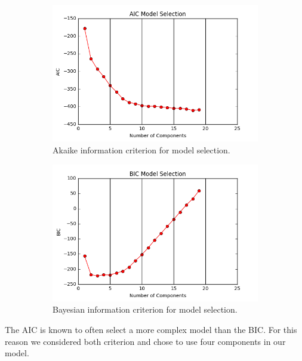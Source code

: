\documentclass{article}
\begin{document}
\begin{figure}[H]
\begin{subfigure}[t]{0.45\textwidth}
\centering
\includegraphics[width=.99\textwidth]{../figs/aic_model.png}
\caption{Akaike information criterion for model selection.}
\label{fig:subim1}
\end{subfigure}\hfill
\begin{subfigure}[t]{0.45\textwidth}
\centering
\includegraphics[width=.99\textwidth]{../figs/bic_model.png}
\caption{Bayesian information criterion for model selection.}
\label{fig:subim2}
\end{subfigure}
\caption{}
\label{fig:image2}
\end{figure}
\noindent
The AIC is known to often select a more complex model than the BIC. For this reason we considered both criterion and chose to use four components in our model.
\end{document}
